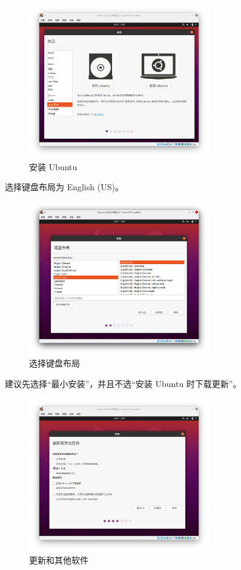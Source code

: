 \documentclass[UTF-8]{ctexart}
\begin{document}
				\begin{figure}[H]
					\centering
					\includegraphics[width=0.7\textwidth]{fig/ubuntu_install_1.png}
					\caption*{安装 Ubuntu}
				\end{figure}
			
				选择键盘布局为 English (US)。
			
				\begin{figure}[H]
					\centering
					\includegraphics[width=0.7\textwidth]{fig/ubuntu_install_2.png}
					\caption*{选择键盘布局}
				\end{figure}
			
				建议先选择“最小安装”，并且不选“安装 Ubuntu 时下载更新”。
			
				\begin{figure}[H]
					\centering
					\includegraphics[width=0.7\textwidth]{fig/ubuntu_install_4.png}
					\caption*{更新和其他软件}
				\end{figure}
			
\end{document}
